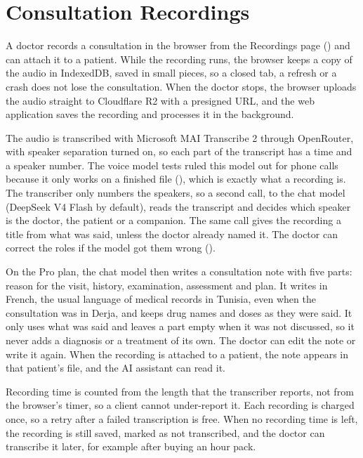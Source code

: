 \section{Consultation Recordings}\label{sec:recordings}

A doctor records a consultation in the browser from the Recordings page () and can attach it to a patient. While the recording runs, the browser keeps a copy of the audio in IndexedDB, saved in small pieces, so a closed tab, a refresh or a crash does not lose the consultation. When the doctor stops, the browser uploads the audio straight to Cloudflare R2 with a presigned URL, and the web application saves the recording and processes it in the background.

The audio is transcribed with Microsoft MAI Transcribe 2 through OpenRouter, with speaker separation turned on, so each part of the transcript has a time and a speaker number. The voice model tests ruled this model out for phone calls because it only works on a finished file (), which is exactly what a recording is. The transcriber only numbers the speakers, so a second call, to the chat model (DeepSeek V4 Flash by default), reads the transcript and decides which speaker is the doctor, the patient or a companion. The same call gives the recording a title from what was said, unless the doctor already named it. The doctor can correct the roles if the model got them wrong ().

On the Pro plan, the chat model then writes a consultation note with five parts: reason for the visit, history, examination, assessment and plan. It writes in French, the usual language of medical records in Tunisia, even when the consultation was in Derja, and keeps drug names and doses as they were said. It only uses what was said and leaves a part empty when it was not discussed, so it never adds a diagnosis or a treatment of its own. The doctor can edit the note or write it again. When the recording is attached to a patient, the note appears in that patient's file, and the AI assistant can read it.

Recording time is counted from the length that the transcriber reports, not from the browser's timer, so a client cannot under-report it. Each recording is charged once, so a retry after a failed transcription is free. When no recording time is left, the recording is still saved, marked as not transcribed, and the doctor can transcribe it later, for example after buying an hour pack.

